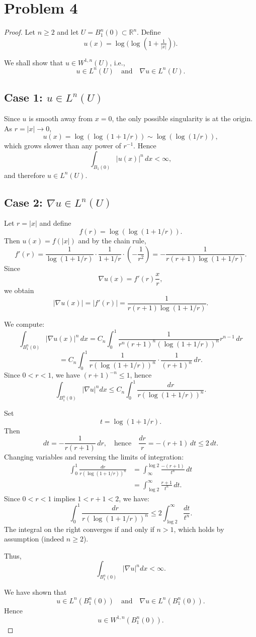 \section{Problem 4}
\begin{proof}
Let $n \ge 2$ and let $U = B_1^n(0) \subset \mathbb{R}^n$. Define
\[
u(x) = \log\!\big(\log(1 + \tfrac{1}{|x|})\big).
\]

We shall show that $u \in W^{1,n}(U)$, i.e.,
\[
u \in L^n(U) \quad \text{and} \quad \nabla u \in L^n(U).
\]

\noindent
\subsection*{Case 1: $u \in L^n(U)$}
Since $u$ is smooth away from $x=0$, the only possible singularity is at the origin. As $r = |x| \to 0$,
\[
u(x) = \log(\log(1 + 1/r)) \sim \log(\log(1/r)),
\]
which grows slower than any power of $r^{-1}$. Hence
\[
\int_{B_1(0)} |u(x)|^n \, dx < \infty,
\]
and therefore $u \in L^n(U)$.

\noindent
\subsection*{Case 2: $\nabla u \in L^n(U)$}
Let $r = |x|$ and define
\[
f(r) = \log(\log(1 + 1/r)).
\]
Then $u(x) = f(|x|)$ and by the chain rule,
\[
f'(r)
= \frac{1}{\log(1+1/r)} \cdot \frac{1}{1+1/r} \cdot \left(-\frac{1}{r^2}\right)
= -\frac{1}{r(r+1)\log(1+1/r)}.
\]
Since
\[
\nabla u(x) = f'(r)\frac{x}{r},
\]
we obtain
\[
|\nabla u(x)| = |f'(r)| 
= \frac{1}{r(r+1)\log(1+1/r)}.
\]

We compute:
\[
\int_{B_1^n(0)} |\nabla u(x)|^n \, dx
= C_n \int_0^1 
\frac{1}{r^n(r+1)^n(\log(1+1/r))^n}
r^{n-1} \, dr
\]
\[
= C_n \int_0^1 
\frac{1}{r(\log(1+1/r))^n} \cdot \frac{1}{(r+1)^n} \, dr.
\]
Since $0 < r < 1$, we have $(r+1)^{-n} \le 1$, hence
\[
\int_{B_1^n(0)} |\nabla u|^n dx
\le C_n \int_0^1 \frac{dr}{r(\log(1+1/r))^n}.
\]

Set
\[
t = \log(1 + 1/r).
\]
Then
\[
dt = -\frac{1}{r(r+1)} \, dr,
\quad \text{hence} \quad
\frac{dr}{r} = -(r+1)\, dt \le 2\, dt.
\]
Changing variables and reversing the limits of integration:
\begin{align*}
    \int_0^1\frac{dr}{r(\log(1+1/r))^n}
    &=\int_{\infty}^{\log 2}\frac{-(r+1)}{t^n}\,dt \\
    &=\int_{\log 2}^{\infty}\frac{r+1}{t^n}\, dt.
\end{align*}
Since $0<r<1$ implies $1<r+1<2$, we have:
\[
\int_0^1 \frac{dr}{r(\log(1+1/r))^n}
\le 2 \int_{\log 2}^{\infty} \frac{dt}{t^n}.
\]
The integral on the right converges if and only if $n>1$, which holds by assumption (indeed $n\ge 2$).

Thus,
\[
\int_{B_1^n(0)} |\nabla u|^n dx < \infty.
\]

We have shown that
\[
u \in L^n(B_1^n(0)) 
\quad \text{and} \quad 
\nabla u \in L^n(B_1^n(0)).
\]
Hence
\[
u \in W^{1,n}(B_1^n(0)).
\]
\end{proof}

